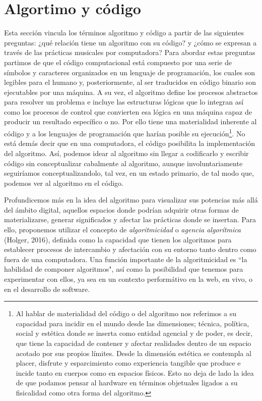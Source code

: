 \section{Algortimo y código}
Esta sección vincula los términos algoritmo y código a partir de las siguientes preguntas: ¿qué relación tiene un algoritmo con su código? y ¿cómo se expresan a través de las prácticas musicales por computadora? Para abordar estas preguntas partimos de que el código computacional está compuesto por una serie de símbolos y caracteres organizados en un lenguaje de programación, los cuales son legibles para el humano y, posteriormente, al ser traducidos en código binario son ejecutables por una máquina. A su vez, el algoritmo define los procesos abstractos para resolver un problema e incluye las estructuras lógicas que lo integran así como los procesos de control que convierten esa lógica en una máquina capaz de producir un resultado específico o no. Por ello tiene una materialidad inherente al código y a los lenguajes de programación que harían posible su ejecución\footnote{Al hablar de materialidad del código o del algoritmo nos referimos a su capacidad para incidir en el mundo desde las dimensiones; técnica, política, social y estética donde se inserta como entidad agencial y de poder, es decir, que tiene la capacidad de contener y afectar realidades dentro de un espacio acotado por sus propios límites. Desde la dimensión estética se contempla al placer, disfrute y esparcimiento como experiencia tangible que produce e incide tanto en cuerpos como en espacios físicos. Esto no deja de lado la idea de que podamos pensar al hardware en términos objetuales ligados a su fisicalidad como otra forma del algoritmo.}. No está demás decir que en una computadora, el código posibilita la implementación del algoritmo. Así, podemos idear al algoritmo sin llegar a codificarlo y escribir código sin conceptualizar cabalmente al algoritmo, aunque involuntariamente seguiríamos conceptualizandolo, tal vez, en un estado primario, de tal modo que, podemos ver al algoritmo en el código.

Profundicemos más en la idea del algoritmo para visualizar sus potencias más allá del ámbito digital, aquellos espacios donde podrían adquirir otras formas de materializarse, generar significados y afectar las prácticas donde se insertan. Para ello, proponemos utilizar el concepto de \emph{ algoritmicidad} o \emph{agencia algorítmica} (Holger, 2016), definida como la capacidad que tienen los algoritmos para establecer procesos de intercambio y afectación con su entorno tanto dentro como fuera de una computadora. Una función importante de la algoritmicidad es “la habilidad de componer algoritmos", así como la posibilidad que tenemos para experimentar con ellos, ya sea en un contexto performátivo en la web, en vivo, o en el desarrollo de software.

